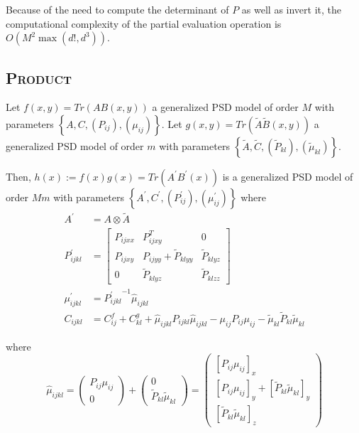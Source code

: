 \begin{remark}
Because of the need to compute the determinant of $P$ as well as invert it, the computational complexity of the partial evaluation operation is $O(M^2\max(d!, d^3))$.
\end{remark}
\subsection{\textsc{Product}}
\begin{proposition}
   Let $f(x, y) = Tr(AB(x, y))$ a generalized PSD model of order $M$ with parameters $\left\lbrace A, C, (P_{ij}), (\mu_{ij})\right\rbrace$.
   Let $g(x, y) = Tr(\tilde A \tilde B(x, y))$ a generalized PSD model of order $m$ with parameters $\left\lbrace \tilde A, \tilde C, (\tilde P_{kl}), (\tilde\mu_{kl})\right\rbrace$.

   Then, $h(x):=f(x)g(x)= Tr(A^\prime B^\prime(x))$ is a generalized PSD model of order $Mm$ with parameters $\left\lbrace A^\prime, C^\prime, (P^\prime_{ij}), (\mu^\prime_{ij})\right\rbrace$ where
    \begin{align}
    A^\prime &= A \otimes \tilde A\\
    P_{ijkl}^\prime &= \left[\begin{array}{ccc}
    P_{ijxx} & P_{ijxy}^T & 0 \\
    P_{ijxy} &P_{ijyy} + \tilde P_{klyy}  & \tilde P_{klyz} \\
    0 & \tilde P_{klyz} & \tilde P_{klzz}
    \end{array}\right]\\
    \mu^\prime_{ijkl} &= {P^\prime_{ijkl}}^{-1}\hat\mu_{ijkl}\\
    C_{ijkl} &= C^f_{ij} + C^g_{kl} +\hat\mu_{ijkl}P_{ijkl}\hat\mu_{ijkl} - \mu_{ij}P_{ij}\mu_{ij} - \tilde\mu_{kl}\tilde P_{kl}\tilde\mu_{kl}
\end{align}

where \begin{equation}
    \hat\mu_{ijkl} =\begin{pmatrix}
    {P_{ij}}\mu_{ij}\\
    0\end{pmatrix} +
    \begin{pmatrix}
     0 \\
    {\tilde P_{kl}}\tilde\mu_{kl}
    \end{pmatrix} =
    \begin{pmatrix}
    [{P_{ij}}\mu_{ij}]_x\\
    [{P_{ij}}\mu_{ij}]_{y} + [{\tilde P_{kl}}\tilde\mu_{kl}]_{y}\\
    [{\tilde P_{kl}}\tilde\mu_{kl}]_{z}
     \end{pmatrix}
     \end{equation}
\end{proposition}

